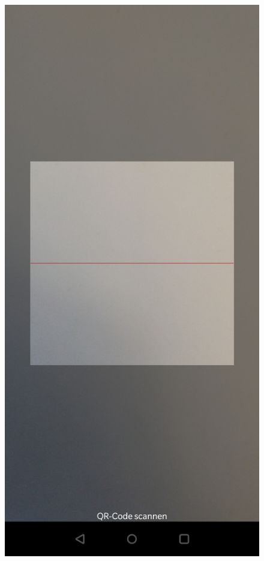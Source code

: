 \documentclass[12pt,					%
							 oneside,			%
							 a4paper,			%
							 halfparskip,		%
							 liststotoc,			%
							 bibtotoc,			%
							 fleqn,				%
							 pointlessnumbers]	%
							 {scrreprt}
\begin{document}
\begin{figure}[ht]
\centering
   \begin{minipage}[b]{.4\linewidth} %
	\centering
	 \includegraphics[scale=0.1]{pictures/scan} 

\end{minipage}
\end{figure}
\end{document}
